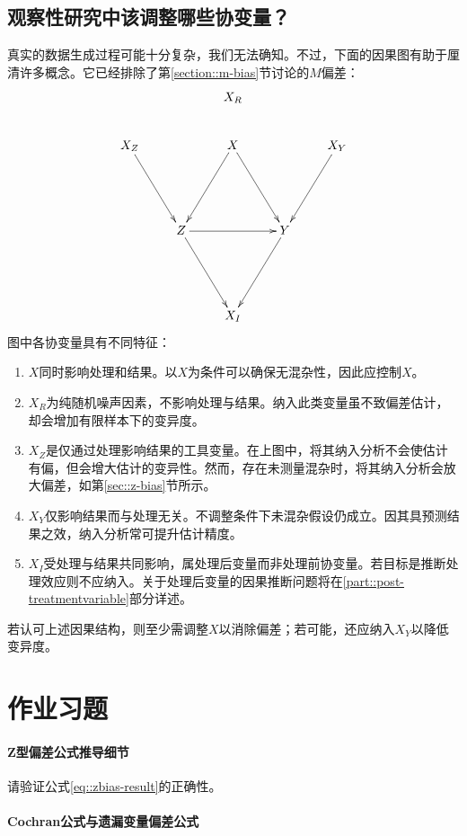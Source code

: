 \subsection{观察性研究中该调整哪些协变量？}


真实的数据生成过程可能十分复杂，我们无法确知。不过，下面的因果图有助于厘清许多概念。它已经排除了第\ref{section::m-bias}节讨论的$M$偏差：$$
\xymatrix{
 &&X_R&& \\
X_Z \ar[ddr] && X \ar[ddl] \ar[ddr]&& X_Y \ar[ddl] \\
 &\\
 &Z \ar[rr] \ar[ddr] &&Y \ar[ddl]& \\
 & \\
 &&X_I&&
}
$$图中各协变量具有不同特征： 
\begin{enumerate}
\item
$X$同时影响处理和结果。以$X$为条件可以确保无混杂性，因此应控制$X$。
\item
$X_R$为纯随机噪声因素，不影响处理与结果。纳入此类变量虽不致偏差估计，却会增加有限样本下的变异度。
\item
$X_Z$是仅通过处理影响结果的工具变量。在上图中，将其纳入分析不会使估计有偏，但会增大估计的变异性。然而，存在未测量混杂时，将其纳入分析会放大偏差，如第\ref{sec::z-bias}节所示。 
\item
$X_Y$仅影响结果而与处理无关。不调整条件下未混杂假设仍成立。因其具预测结果之效，纳入分析常可提升估计精度。
\item
$X_I$受处理与结果共同影响，属处理后变量而非处理前协变量。若目标是推断处理效应则不应纳入。关于处理后变量的因果推断问题将在\ref{part::post-treatmentvariable}部分详述。 
\end{enumerate}



若认可上述因果结构，则至少需调整$X$以消除偏差；若可能，还应纳入$X_Y$以降低变异度。 


 
 
 
\section{作业习题}


\paragraph{Z型偏差公式推导细节}\label{hw::z-bias-formula}
请验证公式\eqref{eq::zbias-result}的正确性。
 

\paragraph{Cochran公式与遗漏变量偏差公式}
\label{hw::cochran+ovb}



